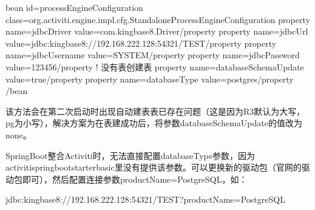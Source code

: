 \documentclass[letterpaper,10pt,english]{sphinxmanual}
\begin{document}
\begin{sphinxVerbatim}[commandchars=\\\{\}]
\PYGZlt{}bean id=\PYGZdq{}processEngineConfiguration\PYGZdq{} class=\PYGZdq{}org.activiti.engine.impl.cfg.StandaloneProcessEngineConfiguration\PYGZdq{}\PYGZgt{}
        \PYGZlt{}property name=\PYGZdq{}jdbcDriver\PYGZdq{} value=\PYGZdq{}com.kingbase8.Driver\PYGZdq{}\PYGZgt{}\PYGZlt{}/property\PYGZgt{}
        \PYGZlt{}property name=\PYGZdq{}jdbcUrl\PYGZdq{} value=\PYGZdq{}jdbc:kingbase8://192.168.222.128:54321/TEST\PYGZdq{}\PYGZgt{}\PYGZlt{}/property\PYGZgt{}
        \PYGZlt{}property name=\PYGZdq{}jdbcUsername\PYGZdq{} value=\PYGZdq{}SYSTEM\PYGZdq{}\PYGZgt{}\PYGZlt{}/property\PYGZgt{}
        \PYGZlt{}property name=\PYGZdq{}jdbcPassword\PYGZdq{} value=\PYGZdq{}123456\PYGZdq{}\PYGZgt{}\PYGZlt{}/property\PYGZgt{}
        \PYGZlt{}!\PYGZhy{}\PYGZhy{} 没有表创建表 \PYGZhy{}\PYGZhy{}\PYGZgt{}
        \PYGZlt{}property name=\PYGZdq{}databaseSchemaUpdate\PYGZdq{} value=\PYGZdq{}true\PYGZdq{}\PYGZgt{}\PYGZlt{}/property\PYGZgt{}
        \PYGZlt{}property name=\PYGZdq{}databaseType\PYGZdq{} value=\PYGZdq{}postgres\PYGZdq{}\PYGZgt{}\PYGZlt{}/property\PYGZgt{}
 \PYGZlt{}/bean\PYGZgt{}
\end{sphinxVerbatim}

该方法会在第二次启动时出现自动建表表已存在问题（这是因为R3默认为大写，pg为小写），解决方案为在表建成功后，将参数databaseSchemaUpdate的值改为none。

\begin{sphinxVerbatim}[commandchars=\\\{\}]
  
\end{sphinxVerbatim}

SpringBoot整合Activiti时，无法直接配置databaseType参数，因为activiti\sphinxhyphen{}spring\sphinxhyphen{}boot\sphinxhyphen{}starter\sphinxhyphen{}basic里没有提供该参数。可以更换新的驱动包（官网的驱动包即可），然后配置连接参数productName=PostgreSQL，如：

\begin{sphinxVerbatim}[commandchars=\\\{\}]
jdbc:kingbase8://192.168.222.128:54321/TEST?productName=PostgreSQL
\end{sphinxVerbatim}
\end{document}
